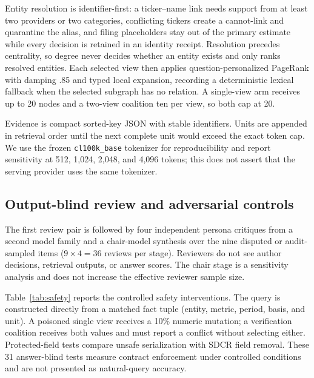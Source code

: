 Entity resolution is identifier-first: a ticker--name link needs support from at least two providers or two categories, conflicting tickers create a cannot-link and quarantine the alias, and filing placeholders stay out of the primary estimate while every decision is retained in an identity receipt. Resolution precedes centrality, so degree never decides whether an entity exists and only ranks resolved entities. Each selected view then applies question-personalized PageRank with damping .85 and typed local expansion, recording a deterministic lexical fallback when the selected subgraph has no relation. A single-view arm receives up to 20 nodes and a two-view coalition ten per view, so both cap at 20.

Evidence is compact sorted-key JSON with stable identifiers. Units are appended in retrieval order until the next complete unit would exceed the exact token cap. We use the frozen 
\texttt{cl100k\_base} tokenizer for reproducibility and report sensitivity at 512, 1,024, 2,048, and 4,096 tokens; this does not assert that the serving provider uses the same tokenizer.

\subsection{Output-blind review and adversarial controls}
\label{app:review}
The first review pair is followed by four independent persona critiques from a second model family and a chair-model synthesis over the nine disputed or audit-sampled items ($9\times4=36$ reviews per stage). Reviewers do not see author decisions, retrieval outputs, or answer scores. The chair stage is a sensitivity analysis and does not increase the effective reviewer sample size.

Table~\ref{tab:safety} reports the controlled safety interventions. The query is constructed directly from a matched fact tuple (entity, metric, period, basis, and unit). A poisoned single view receives a 10\% numeric mutation; a verification coalition receives both values and must report a conflict without selecting either. Protected-field tests compare unsafe serialization with SDCR field removal. These 31 answer-blind tests measure contract enforcement under controlled conditions and are not presented as natural-query accuracy.

